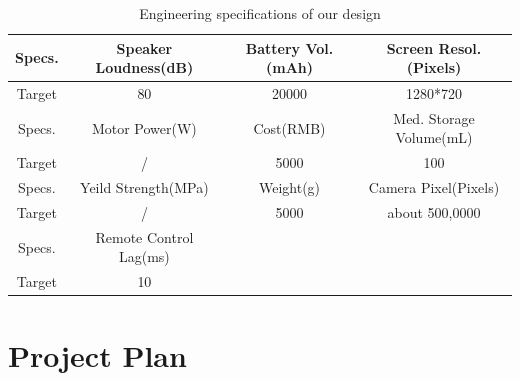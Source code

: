 \documentclass[12pt]{article}
\begin{document}
\begin{table}[H]
	\centering
\begin{tabular}{|c|c|c|c|}
\hline
Specs. & Speaker Loudness(dB)   & Battery Vol.(mAh) & Screen Resol.(Pixels)   \\ \hline
Target   & 80                     & 20000               & 1280*720                    \\ \hline
Specs. & Motor Power(W)         & Cost(RMB)           & Med. Storage Volume(mL) \\ \hline
Target  & /                      & 5000                & 100                         \\ \hline
Specs. & Yeild Strength(MPa)    & Weight(g)           & Camera Pixel(Pixels)        \\ \hline
Target   & /                      & 5000                & about 500,0000              \\ \hline
Specs. & Remote Control Lag(ms) &                     &                             \\ \hline
Target    & 10                     &                     &                             \\ \hline
\end{tabular}
\caption{Engineering specifications of our design }
\label{tab:spec}
\end{table}

\section{Project Plan}
\end{document}
